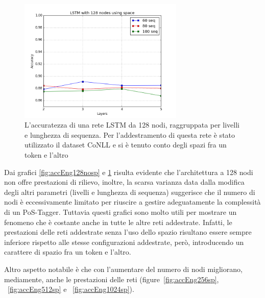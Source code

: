 \begin{figure}[H]
  \centering
  \begin{center}
    \includegraphics[width=0.7\textwidth]{./images/plots/english/accuracy_128n_word_min_loss_using_spaces.png}
  \end{center}
  \caption{L'accuratezza di una rete LSTM da 128 nodi, raggruppata per livelli e
          lunghezza di sequenza. Per l'addestramento di questa rete \`e stato
          utilizzato il dataset CoNLL e si \`e tenuto conto degli spazi fra un
          token e l'altro}
  \label{fig:accEng128sp}
\end{figure}

Dai grafici \ref{fig:accEng128nosp} e \ref{fig:accEng128sp} risulta evidente che
l'architettura a 128 nodi non offre prestazioni di rilievo, inoltre, la scarsa
varianza data dalla modifica degli altri parametri (livelli e lunghezza di sequenza)
suggerisce che il numero di nodi \`e eccessivamente limitato per riuscire a
gestire adeguatamente la complessit\`a di un PoS-Tagger. Tuttavia questi grafici
sono molto utili per mostrare un fenomeno che \`e costante anche in tutte le altre
reti addestrate. Infatti, le prestazioni delle reti addestrate senza l'uso dello
spazio risultano essere sempre inferiore rispetto alle stesse configurazioni
addestrate, per\`o, introducendo un carattere di spazio fra un token e l'altro.

Altro aspetto notabile \`e che con l'aumentare del numero di nodi migliorano,
mediamente, anche le prestazioni delle reti (figure~\ref{fig:accEng256sp},
 ~\ref{fig:accEng512sp} e ~\ref{fig:accEng1024sp}).

